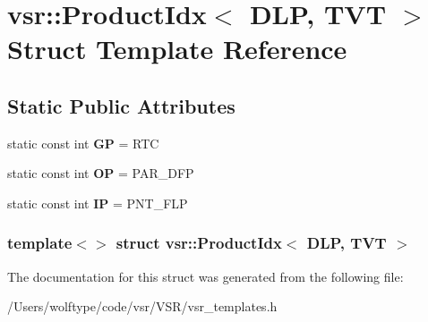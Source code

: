 \hypertarget{structvsr_1_1_product_idx_3_01_d_l_p_00_01_t_v_t_01_4}{\section{vsr\-:\-:Product\-Idx$<$ D\-L\-P, T\-V\-T $>$ Struct Template Reference}
\label{structvsr_1_1_product_idx_3_01_d_l_p_00_01_t_v_t_01_4}
}
\subsection*{Static Public Attributes}
\begin{DoxyCompactItemize}
\item 
\hypertarget{structvsr_1_1_product_idx_3_01_d_l_p_00_01_t_v_t_01_4_af34a51d2821376a64fad4521d03d2831}{static const int {\bfseries G\-P} = R\-T\-C}\label{structvsr_1_1_product_idx_3_01_d_l_p_00_01_t_v_t_01_4_af34a51d2821376a64fad4521d03d2831}

\item 
\hypertarget{structvsr_1_1_product_idx_3_01_d_l_p_00_01_t_v_t_01_4_a11694f4a8b4b5ba38b824afb87f59944}{static const int {\bfseries O\-P} = P\-A\-R\-\_\-\-D\-F\-P}\label{structvsr_1_1_product_idx_3_01_d_l_p_00_01_t_v_t_01_4_a11694f4a8b4b5ba38b824afb87f59944}

\item 
\hypertarget{structvsr_1_1_product_idx_3_01_d_l_p_00_01_t_v_t_01_4_a1b84b7021ef95d19a879e0ef57ff6e9f}{static const int {\bfseries I\-P} = P\-N\-T\-\_\-\-F\-L\-P}\label{structvsr_1_1_product_idx_3_01_d_l_p_00_01_t_v_t_01_4_a1b84b7021ef95d19a879e0ef57ff6e9f}

\end{DoxyCompactItemize}
\subsubsection*{template$<$$>$ struct vsr\-::\-Product\-Idx$<$ D\-L\-P, T\-V\-T $>$}



The documentation for this struct was generated from the following file\-:\begin{DoxyCompactItemize}
\item 
/\-Users/wolftype/code/vsr/\-V\-S\-R/vsr\-\_\-templates.\-h\end{DoxyCompactItemize}
